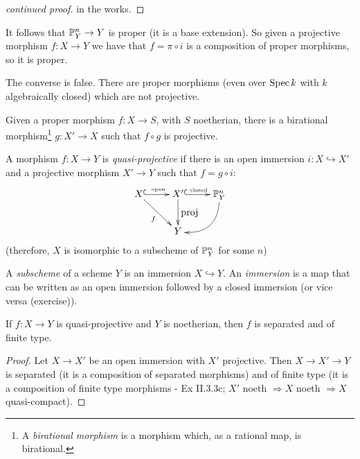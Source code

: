  \setcounter{lecture}{10}

\begin{proof}[continued proof]
in the works.
\end{proof}
  It
follows that $\P^n_Y\to Y$ is proper (it is a base extension). So
given a projective morphism $f:X\to Y$ we have that $f=\pi\circ i$
is a composition of proper morphisms, so it is proper.

The converse is false.  There are proper morphisms (even over
$\spec k$ with $k$ algebraically closed) which are not projective.

\begin{lemma}
Given a proper morphism $f:X\to S$, with $S$ noetherian, there is
a birational morphism\footnote{A \emph{birational morphism} is a
morphism which, as a rational map, is birational.} $g:X'\to X$
such that $f\circ g$ is projective.
\end{lemma}

\begin{definition}
A morphism $f:X\to Y$ is \emph{quasi-projective} if there is an
open immersion $i:X\hookrightarrow X'$ and a projective morphism
$X'\to Y$ such that $f=g\circ i$:
\[\xymatrix{
 X \ar@{^(->}[r]^{\txt{\tiny open}} \ar[dr]_f & X'
 \ar@{^(->}[r]^{\txt{\tiny closed}} \ar[d]^{\txt{proj}} & \P^n_Y
 \ar@/^4ex/[dl]
 \\
 & Y
}\] (therefore, $X$ is isomorphic to a subscheme of $\P^n_Y$ for
some $n$)
\end{definition}

\begin{definition}
A \emph{subscheme} of a scheme $Y$ is an immersion
$X\hookrightarrow Y$.  An \emph{immersion} is a map that can be
written as an open immersion followed by a closed immersion (or
vice versa (exercise)).
\end{definition}

\begin{theorem}
If $f:X\to Y$ is quasi-projective and $Y$ is noetherian, then $f$
is separated and of finite type.
\end{theorem}
\begin{proof}
Let $X\to X'$ be an open immersion with $X'$ projective.  Then
$X\to X' \to Y$ is separated (it is a composition of separated
morphisms) and of finite type (it is a composition of finite type
morphisms - Ex II.3.3c; $X'$ noeth $\Rightarrow X$ noeth
$\Rightarrow X$ quasi-compact).
\end{proof}


